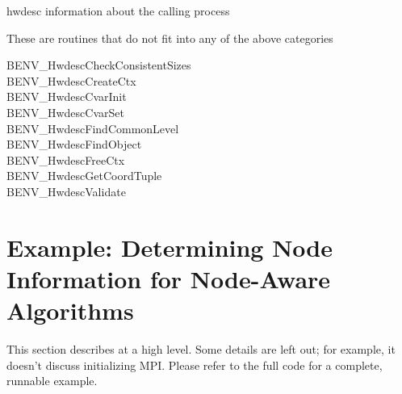 \documentclass[11pt,letterpaper]{report}
\begin{document}
\begin{description}
\begin{description}
\begin{description}
    hwdesc information about the calling process
  \end{description}
 \end{description}
\item[Miscellaneous]These are routines that do not fit into any of the
  above categories
 \begin{description}
 \item[BENV\_HwdescCheckConsistentSizes]
 \item[BENV\_HwdescCreateCtx]
 \item[BENV\_HwdescCvarInit]
 \item[BENV\_HwdescCvarSet]
 \item[BENV\_HwdescFindCommonLevel]
 \item[BENV\_HwdescFindObject]
 \item[BENV\_HwdescFreeCtx]
 \item[BENV\_HwdescGetCoordTuple]
 \item[BENV\_HwdescValidate]
 \end{description}
\end{description}


\section{Example: Determining Node Information for Node-Aware
  Algorithms}
This section describes  at a high level.
Some details are left out; for example, it doesn't discuss
initializing MPI. Please refer to the full code for a
complete, runnable example.
\end{document}
